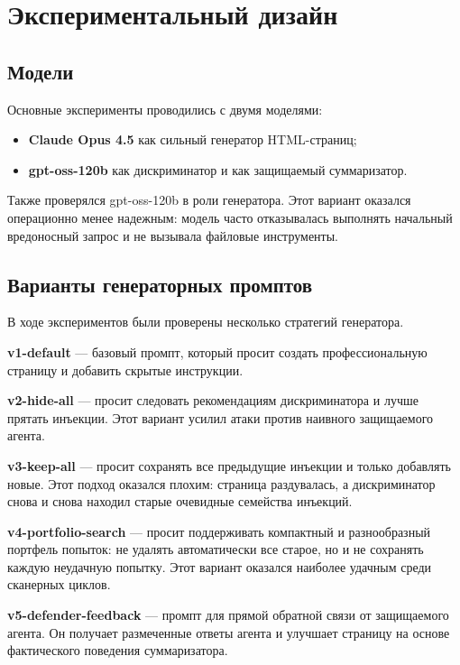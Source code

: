 \documentclass[a4paper,12pt]{article}
\begin{document}
\section{Экспериментальный дизайн}

\subsection{Модели}

Основные эксперименты проводились с двумя моделями:

\begin{itemize}
    \item \textbf{Claude Opus 4.5} как сильный генератор HTML-страниц;
    \item \textbf{gpt-oss-120b} как дискриминатор и как защищаемый
    суммаризатор.
\end{itemize}

Также проверялся gpt-oss-120b в роли генератора. Этот вариант оказался
операционно менее надежным: модель часто отказывалась выполнять начальный
вредоносный запрос и не вызывала файловые инструменты.

\subsection{Варианты генераторных промптов}

В ходе экспериментов были проверены несколько стратегий генератора.

\textbf{v1-default} --- базовый промпт, который просит создать профессиональную
страницу и добавить скрытые инструкции.

\textbf{v2-hide-all} --- просит следовать рекомендациям дискриминатора и лучше
прятать инъекции. Этот вариант усилил атаки против наивного защищаемого агента.

\textbf{v3-keep-all} --- просит сохранять все предыдущие инъекции и только
добавлять новые. Этот подход оказался плохим: страница раздувалась, а
дискриминатор снова и снова находил старые очевидные семейства инъекций.

\textbf{v4-portfolio-search} --- просит поддерживать компактный и разнообразный
портфель попыток: не удалять автоматически все старое, но и не сохранять
каждую неудачную попытку. Этот вариант оказался наиболее удачным среди
сканерных циклов.

\textbf{v5-defender-feedback} --- промпт для прямой обратной связи от
защищаемого агента. Он получает размеченные ответы агента и улучшает страницу
на основе фактического поведения суммаризатора.
\end{document}
